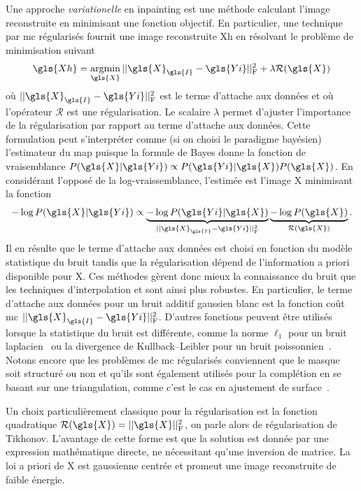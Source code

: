 Une approche \emph{variationelle} en inpainting est une méthode calculant l'image reconstruite en minimisant une fonction objectif. En particulier, une technique par \gls{mc} régularisés fournit une image reconstruite \gls{Xh} en résolvant le problème de minimisation suivant~\cite[Section~6.3]{boyd2004convex}
\begin{equation}\label{eq-MC-regul}
    \gls{Xh} = \argmin_{\gls{X}} \frobnorm{\gls{X}_{\gls{I}} - \gls{Yi}} + \lambda \mathcal{R}(\gls{X})
\end{equation}
où $\frobnorm{\gls{X}_{\gls{I}} - \gls{Yi}}$ est le terme d'attache aux données et où l'opérateur $\mathcal{R}$ est une régularisation. Le scalaire $\lambda$ permet d'ajuster l'importance de la régularisation par rapport au terme d'attache aux données. Cette formulation peut s'interpréter comme (si on choisi le paradigme bayésien) l'estimateur du \gls{map} puisque la formule de Bayes donne la fonction de vraisemblance $P(\gls{X}|\gls{Yi}) \propto P(\gls{Yi}|\gls{X}) P(\gls{X})$. En considérant l'opposé de la log-vraissemblance, l'estimée est l'image \gls{X} minimisant la fonction
\begin{equation}
    -\log P(\gls{X}|\gls{Yi}) \propto
    \underbrace{-\log P(\gls{Yi}|\gls{X})}_{\frobnorm{\gls{X}_{\gls{I}} - \gls{Yi}}}
    \underbrace{- \log P(\gls{X})}_{\mathcal{R}(\gls{X})}.
\end{equation}
Il en résulte que le terme d'attache aux données est choisi en fonction du modèle statistique du bruit tandis que la régularisation dépend de l'information a priori disponible pour \gls{X}. Ces méthodes gèrent donc mieux la connaissance du bruit que les techniques d'interpolation et sont ainsi plus robustes. En particulier, le terme d'attache aux données pour un bruit additif gaussien blanc est la fonction coût \gls{mc} $\frobnorm{\gls{X}_{\gls{I}} - \gls{Yi}}$. D'autres fonctions peuvent être utilisés lorsque la statistique du bruit est différente, comme la norme $\ell_1$ pour un bruit laplacien~\cite{frecon2017bayesian} ou la divergence de Kullback–Leibler pour un bruit poissonnien~\cite{ono2013poisson}. Notons encore que les problèmes de \gls{mc} régularisés conviennent que le masque soit structuré ou non et qu'ils sont également utilisés pour la complétion en se basant sur une triangulation, comme c'est le cas en ajustement de surface~\cite{zhong2016surface,cazals2006delaunay}.

Un choix particulièrement classique pour la régularisation est la fonction quadratique $\mathcal{R}(\gls{X}) = \frobnorm{\gls{X}}$, on parle alors de régularisation de Tikhonov. L'avantage de cette forme est que la solution est  donnée par une expression mathématique directe, ne nécessitant qu'une inversion de matrice. La loi a priori de \gls{X} est gaussienne centrée et promeut une image reconstruite de faible énergie.

